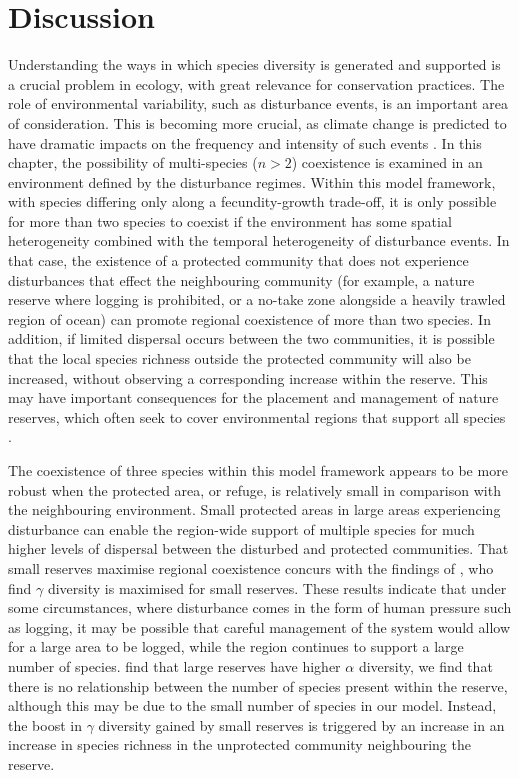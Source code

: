 \section{Discussion}
Understanding the ways in which species diversity is generated and supported is a crucial problem in ecology, with great relevance for conservation practices. The role of environmental variability, such as disturbance events, is an important area of consideration. This is becoming more crucial, as climate change is predicted to have dramatic impacts on the frequency and intensity of such events \citep[e.g.][]{webster2005changes}. In this chapter, the possibility of multi-species ($n>2$) coexistence is examined in an environment defined by the disturbance regimes. Within this model framework, with species differing only along a fecundity-growth trade-off, it is only possible for more than two species to coexist if the environment has some spatial heterogeneity combined with the temporal heterogeneity of disturbance events. In that case, the existence of a protected community that does not experience disturbances that effect the neighbouring community (for example, a nature reserve where logging is prohibited, or a no-take zone alongside a heavily trawled region of ocean) can promote regional coexistence of more than two species. In addition, if limited dispersal occurs between the two communities, it is possible that the local species richness outside the protected community will also be increased, without observing a corresponding increase within the reserve. This may have important consequences for the placement and management of nature reserves, which often seek to cover environmental regions that support all species \citep[e.g.][]{margules1988selecting,scott2001nature}.

The coexistence of three species within this model framework appears to be more robust when the protected area, or refuge, is relatively small in comparison with the neighbouring environment. Small protected areas in large areas experiencing disturbance can enable the region-wide support of multiple species for much higher levels of dispersal between the disturbed and protected communities. That small reserves maximise regional coexistence concurs with the findings of \cite{lasky2013reserve}, who find $\gamma$ diversity is maximised for small reserves. These results indicate that under some circumstances, where disturbance comes in the form of human pressure such as logging, it may be possible that careful management of the system would allow for a large area to be logged, while the region continues to support a large number of species.
\cite{lasky2013reserve} find that large reserves have higher $\alpha$ diversity, we find that there is no relationship between the number of species present within the reserve, although this may be due to the small number of species in our model. Instead, the boost in $\gamma$ diversity gained by small reserves is triggered by an increase in an increase in species richness in the unprotected community neighbouring the reserve.

